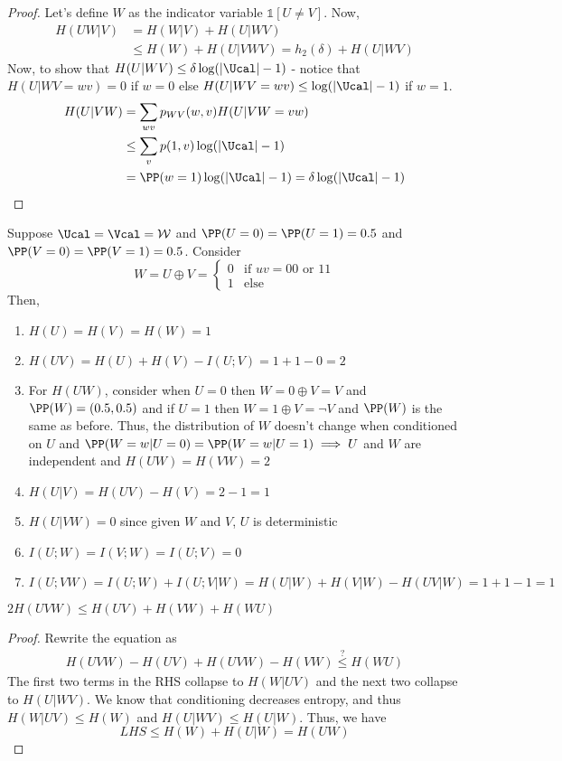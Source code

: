 \begin{proof}
Let's define $W$ as the indicator variable $\mathbb{1}[U\neq V]$. Now,
\begin{align*}
    H(UW|V) &= H(W|V) + H(U|WV) \\
    &\leq H(W) + H(U|VWV) = h_2(\delta) + H(U|WV)
\end{align*}
Now, to show that $H(U|WV) \leq \delta \log(|\Ucal| - 1)$ - notice that $H(U|WV=wv) = 0$ if $w = 0$ else $H(U|WV=wv) \leq \log(|\Ucal| - 1)$ if $w = 1$.
\begin{align*}
    H(U|VW) &= \sum_{wv} p_{WV}(w,v)H(U|VW=vw) \\
    &\leq\sum_v p(1,v) \log(|\Ucal| - 1)  \\
    &= \PP(w=1)\log(|\Ucal|-1) = \delta \log(|\Ucal| - 1)
\end{align*}
\end{proof}
\begin{eg}
Suppose $\Ucal = \Vcal = \mathcal{W}$ and $\PP(U=0) = \PP(U=1) = 0.5$ and $\PP(V=0) = \PP(V=1) = 0.5$. Consider 
\[W = U \oplus V = \begin{cases}
0 & \text{if } uv = 00 \text{ or } 11 \\
1 & \text{else }
\end{cases}\]
Then,
\begin{enumerate}
    \item $H(U) = H(V) = H(W) = 1$
    \item $H(UV) = H(U) + H(V) - I(U;V) = 1 + 1 - 0 = 2$
    \item For $H(UW)$, consider when $U = 0$ then $W = 0 \oplus V = V$ and $\PP(W) = (0.5, 0.5)$ and if $U = 1$ then $W = 1 \oplus V = \neg V$ and $\PP(W)$ is the same as before. Thus, the distribution of $W$ doesn't change when conditioned on $U$ and $\PP(W=w|U=0) = \PP(W=w|U=1) \implies U$ and $W$ are independent and $H(UW) = H(VW) = 2$ 
    \item $H(U|V) = H(UV) - H(V) = 2 - 1 = 1$
    \item $H(U|VW) = 0$ since given $W$ and $V$, $U$ is deterministic
    \item $I(U;W) = I(V;W) = I(U;V) = 0$
    \item $I(U;VW) = I(U;W) + I(U;V|W) = H(U|W) + H(V|W) - H(UV|W) = 1 + 1 - 1 = 1$
\end{enumerate}
\end{eg}
\begin{theorem}
$2H(UVW) \leq H(UV) + H(VW) + H(WU)$
\end{theorem}
\begin{proof}
Rewrite the equation as
\begin{align*}
    H(UVW) - H(UV) + H(UVW) - H(VW) \overset{?}{\leq} H(WU) 
\end{align*}
The first two terms in the RHS collapse to $H(W|UV)$ and the next two collapse to $H(U|WV)$. We know that conditioning decreases entropy, and thus $H(W|UV) \leq H(W)$ and $H(U|WV) \leq H(U|W)$. Thus, we have
\[LHS \leq H(W) + H(U|W) = H(UW)\]
\end{proof}
